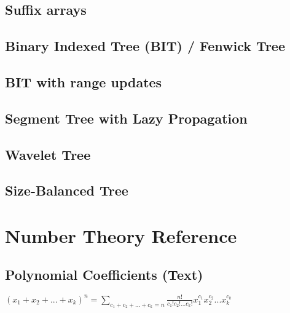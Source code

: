 \documentclass[10pt]{extarticle}
\begin{document}
\begin{multicols*}{3}
\subsection{Suffix arrays} %


\subsection{Binary Indexed Tree (BIT) / Fenwick Tree} %


\subsection{BIT with range updates} %


\subsection{Segment Tree with Lazy Propagation} %


\subsection{Wavelet Tree} %


\subsection{Size-Balanced Tree}


\section{Number Theory Reference}
\subsection{Polynomial Coefficients (Text)} %
$(x_1 + x_2 + ... + x_k)^n = \sum_{c_1 + c_2 + ... + c_k = n}
\frac{n!}{c_1! c_2! ... c_k!} x_1^{c_1} x_2^{c_2} ... x_k^{c_k}$


\end{multicols*}
\end{document}
